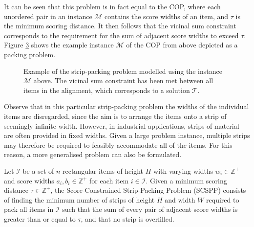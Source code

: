 \documentclass[oribibl]{llncs}
\begin{document}
It can be seen that this problem is in fact equal to the COP, where each unordered pair in an instance $\mathcal{M}$ contains the score widths of an item, and $\tau$ is the minimum scoring distance. It then follows that the vicinal sum constraint corresponds to the requirement for the sum of adjacent score widths to exceed $\tau$. Figure \ref{fig:items/aligned} shows the example instance $\mathcal{M}$ of the COP from above depicted as a packing problem.

\begin{figure}	
	\centering
	\begin{subfigure}[h]{0.44\textwidth}
		
		\label{fig:items} \vspace{5pt}
	\end{subfigure} 
	\begin{subfigure}[h]{0.7\textwidth}
		
		\label{fig:itemsaligned}
	\end{subfigure}
	\caption{Example of the strip-packing problem modelled using the instance $\mathcal{M}$ above. The vicinal sum constraint has been met between all items in the alignment, which corresponds to a solution $\mathcal{T}$.}
	\label{fig:items/aligned}
\end{figure}

Observe that in this particular strip-packing problem the widths of the individual items are disregarded, since the aim is to arrange the items onto a strip of seemingly infinite width. However, in industrial applications, strips of material are often provided in fixed widths. Given a large problem instance, multiple strips may therefore be required to feasibly accommodate all of the items. For this reason, a more generalised problem can also be formulated.

\begin{definition}
	Let $\mathcal{I}$ be a set of $n$ rectangular items of height $H$ with varying widths $w_i \in \mathbb{Z}^+$ and score widths $a_i, b_i \in \mathbb{Z}^+$ for each item $i \in \mathcal{I}$. Given a minimum scoring distance $\tau \in \mathbb{Z}^+$, the Score-Constrained Strip-Packing Problem (SCSPP) consists of finding the minimum number of strips of height $H$ and width $W$ required to pack all items in $\mathcal{I}$ such that the sum of every pair of adjacent score widths is greater than or equal to $\tau$, and that no strip is overfilled.
\end{definition}
\end{document}
